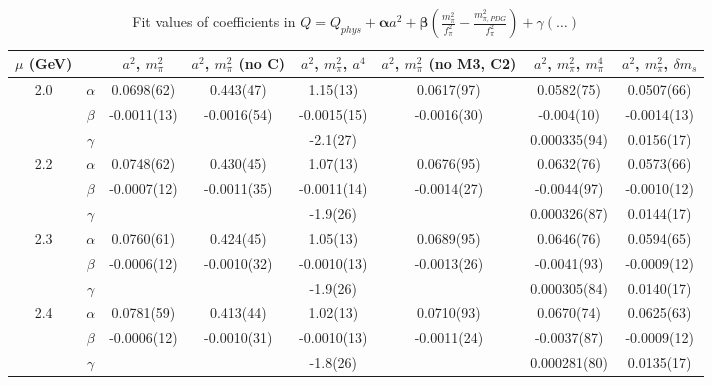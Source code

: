 \documentclass[12pt]{extarticle}
\begin{document}
\begin{table}[h!]
\begin{center}
\begin{tabular}{|c c|c|c|c|c|c|c|}
\hline
$\mu$ (GeV) &  & $a^2$, $m_\pi^2$& $a^2$, $m_\pi^2$ (no C)& $a^2$, $m_\pi^2$, $a^4$& $a^2$, $m_\pi^2$ (no M3, C2)& $a^2$, $m_\pi^2$, $m_\pi^4$& $a^2$, $m_\pi^2$, $\delta m_s$\\
\hline
\multirow{3}{0.5in}{2.0} & $\alpha$ & 0.0698(62)& 0.443(47)& 1.15(13)& 0.0617(97)& 0.0582(75)& 0.0507(66)\\
 & $\beta$ & -0.0011(13)& -0.0016(54)& -0.0015(15)& -0.0016(30)& -0.004(10)& -0.0014(13)\\
 & $\gamma$ &  &  & -2.1(27)&  & 0.000335(94)& 0.0156(17)\\
\hline
\multirow{3}{0.5in}{2.2} & $\alpha$ & 0.0748(62)& 0.430(45)& 1.07(13)& 0.0676(95)& 0.0632(76)& 0.0573(66)\\
 & $\beta$ & -0.0007(12)& -0.0011(35)& -0.0011(14)& -0.0014(27)& -0.0044(97)& -0.0010(12)\\
 & $\gamma$ &  &  & -1.9(26)&  & 0.000326(87)& 0.0144(17)\\
\hline
\multirow{3}{0.5in}{2.3} & $\alpha$ & 0.0760(61)& 0.424(45)& 1.05(13)& 0.0689(95)& 0.0646(76)& 0.0594(65)\\
 & $\beta$ & -0.0006(12)& -0.0010(32)& -0.0010(13)& -0.0013(26)& -0.0041(93)& -0.0009(12)\\
 & $\gamma$ &  &  & -1.9(26)&  & 0.000305(84)& 0.0140(17)\\
\hline
\multirow{3}{0.5in}{2.4} & $\alpha$ & 0.0781(59)& 0.413(44)& 1.02(13)& 0.0710(93)& 0.0670(74)& 0.0625(63)\\
 & $\beta$ & -0.0006(12)& -0.0010(31)& -0.0010(13)& -0.0011(24)& -0.0037(87)& -0.0009(12)\\
 & $\gamma$ &  &  & -1.8(26)&  & 0.000281(80)& 0.0135(17)\\
\hline
\end{tabular}
\caption{Fit values of coefficients in $Q = Q_{phys} + \mathbf{\alpha} a^2 + \mathbf{\beta}\left(\frac{m_\pi^2}{f_\pi^2}-\frac{m_{\pi,PDG}^2}{f_\pi^2}\right) + \gamma(\ldots)$}
\end{center}
\end{table}






\end{document}
